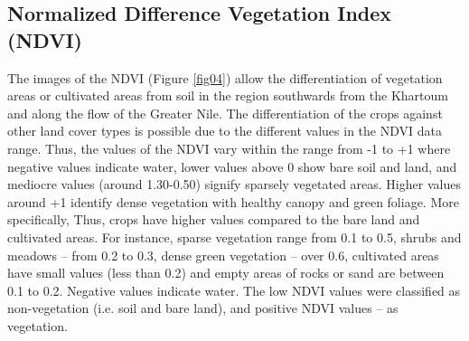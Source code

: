 \documentclass[jimaging,article,submit,pdftex,moreauthors]{Definitions/mdpi}
\begin{document}
\subsection{Normalized Difference Vegetation Index (NDVI)}
The images of the NDVI (Figure \ref{fig04}) allow the differentiation of vegetation areas or cultivated areas from soil in the region southwards from the Khartoum and along the flow of the Greater Nile. The differentiation of the crops against other land cover types is possible due to the different values in the NDVI data range. Thus, the values of the NDVI vary within the range from -1 to +1 where negative values indicate water, lower values above 0 show bare soil and land, and mediocre values (around 1.30-0.50) signify sparsely vegetated areas. Higher values around +1 identify dense vegetation with healthy canopy and green foliage. More specifically, Thus, crops have higher values compared to the bare land and cultivated areas. For instance, sparse vegetation range from 0.1 to 0.5, shrubs and meadows -- from 0.2 to 0.3, dense green vegetation -- over 0.6, cultivated areas have small values (less than 0.2) and empty areas of rocks or sand are between 0.1 to 0.2. Negative values indicate water. The low NDVI values were classified as non-vegetation (i.e. soil and bare land), and positive NDVI values -- as vegetation. 
\end{document}
